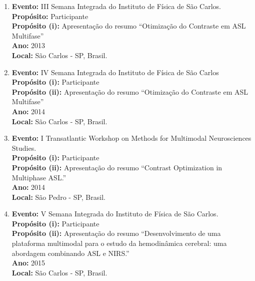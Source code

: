 \documentclass[a4paper,oneside,10pt]{article}
\begin{document}
\begin{enumerate}
\renewcommand{\labelenumi}{{\large\bfseries\arabic{enumi}.}}

\item   \textbf{Evento:} III Semana Integrada do Instituto de Física de São Carlos. \mbox{} \\
        \textbf{Propósito:} Participante\\
        \textbf{Propósito (i):} Apresentação do resumo ``Otimização do Contraste em ASL Multifase''\\
        \textbf{Ano:} 2013\\
        \textbf{Local:} São Carlos - SP, Brasil.

\item   \textbf{Evento:} IV Semana Integrada do Instituto de Física de São Carlos \mbox{} \\
        \textbf{Propósito (i):} Participante\\
        \textbf{Propósito (ii):} Apresentação do resumo ``Otimização do Contraste em ASL Multifase''\\
        \textbf{Ano:} 2014\\
        \textbf{Local:} São Carlos - SP, Brasil.

        \item   \textbf{Evento:} I Transatlantic Workshop on Methods for Multimodal Neurosciences Studies. \mbox{} \\
        \textbf{Propósito (i):} Participante\\
        \textbf{Propósito (ii):} Apresentação do resumo ``Contrast Optimization in Multiphase ASL.''\\
        \textbf{Ano:} 2014\\
        \textbf{Local:} São Pedro - SP, Brasil. 
        
        \item   \textbf{Evento:} V Semana Integrada do Instituto de Física de São Carlos. \mbox{} \\
        \textbf{Propósito (i):} Participante\\
        \textbf{Propósito (ii):} Apresentação do resumo ``Desenvolvimento de uma plataforma multimodal para o estudo da hemodinâmica cerebral: uma abordagem combinando ASL e NIRS.''\\
        \textbf{Ano:} 2015\\
        \textbf{Local:} São Carlos - SP, Brasil.


\end{enumerate}
\end{document}
